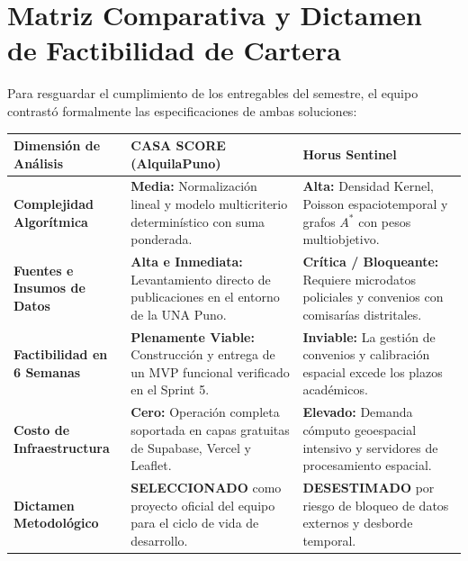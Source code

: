 \documentclass[11pt,a4paper]{article}
\begin{document}
\clearpage


\section{Matriz Comparativa y Dictamen de Factibilidad de Cartera}
Para resguardar el cumplimiento de los entregables del semestre, el equipo contrastó formalmente las especificaciones de ambas soluciones:

\vspace{0.2cm}
\noindent\begin{tabularx}{\textwidth}{p{3.8cm} X X}
\toprule
\textbf{Dimensión de Análisis} & \textbf{CASA SCORE (AlquilaPuno)} & \textbf{Horus Sentinel} \\
\midrule
\textbf{Complejidad Algorítmica} & \textbf{Media:} Normalización lineal y modelo multicriterio determinístico con suma ponderada. & \textbf{Alta:} Densidad Kernel, Poisson espaciotemporal y grafos $A^*$ con pesos multiobjetivo. \\
\addlinespace[3pt]
\textbf{Fuentes e Insumos de Datos} & \textbf{Alta e Inmediata:} Levantamiento directo de publicaciones en el entorno de la UNA Puno. & \textbf{Crítica / Bloqueante:} Requiere microdatos policiales y convenios con comisarías distritales. \\
\addlinespace[3pt]
\textbf{Factibilidad en 6 Semanas} & \textbf{Plenamente Viable:} Construcción y entrega de un MVP funcional verificado en el Sprint 5. & \textbf{Inviable:} La gestión de convenios y calibración espacial excede los plazos académicos. \\
\addlinespace[3pt]
\textbf{Costo de Infraestructura} & \textbf{Cero:} Operación completa soportada en capas gratuitas de Supabase, Vercel y Leaflet. & \textbf{Elevado:} Demanda cómputo geoespacial intensivo y servidores de procesamiento espacial. \\
\addlinespace[3pt]
\textbf{Dictamen Metodológico} & \textbf{SELECCIONADO} como proyecto oficial del equipo para el ciclo de vida de desarrollo. & \textbf{DESESTIMADO} por riesgo de bloqueo de datos externos y desborde temporal. \\
\bottomrule
\end{tabularx}

\vspace{0.3cm}
\end{document}
